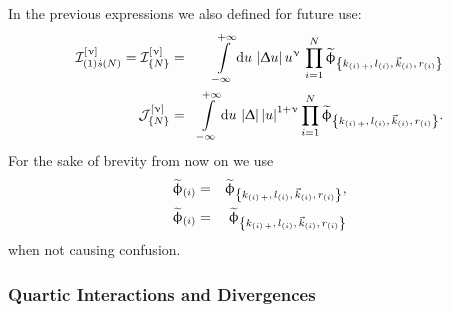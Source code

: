 In the previous expressions we also defined for future use:
\begin{eqnarray}
  \cI_{\qty(1) \dots (N)}^{\qty[\nu]}
  =
  \cI_{\qty{N}}^{\qty[\nu]}
  & = &
  \infinfint{u}\,
  \abs{\Delta u}\, u^{\nu}\,
  \finiteprod{i}{1}{N}
  \tphi_{\kmkrN{i}}
  \\
  \cJ_{\qty{N}}^{\qty[\nu]}
  & = &
  \infinfint{u}\,
  \abs{\Delta}\, \abs{u}^{1 + \nu}
  \finiteprod{i}{1}{N} \tphi_{\kmkrN{i}}.
\end{eqnarray}
For the sake of brevity from now on we use
\begin{eqnarray}
  \tphi_{\qty(i)} & = & \tphi_{\kmkrN{i}},
  \\
  \tphi_{\qty(i)} & = & \tphi_{\kmkrN{i}}
\end{eqnarray}
when not causing confusion.


\subsubsection{Quartic Interactions and Divergences}

